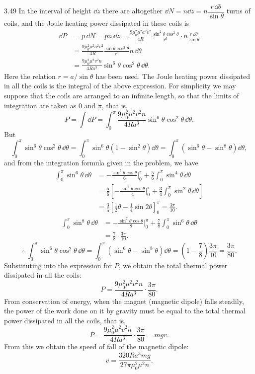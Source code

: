 \begin{solution}{3.49}
In the interval of height $\dd z$ there are altogether $\dd N=n\dd z=n\dfrac{r\,\dd\theta}{\sin\theta}$ turns of coils, and the Joule heating power dissipated in these coils is
\begin{align*}
\dd P &= p\,\dd N=pn\,\dd z=\frac{9\mu_0^2\mu^2a^2v^2}{4R}\frac{\sin^2\theta\cos^2\theta}{r^6}\cdot n\frac{r\,\dd\theta}{\sin\theta}\\
&= \frac{9\mu_0^2\mu^2a^2v^2}{4R}\frac{\sin\theta\cos^2\theta}{r^5}n\,\dd\theta\\
&= \frac{9\mu_0^2\mu^2v^2n}{4Ra^3}\sin^6\theta\cos^2\theta\,\dd\theta.
\end{align*}
Here the relation $r=a/\sin\theta$ has been used. The Joule heating power dissipated in all the coils is the integral of the above expression. For simplicity we may suppose that the coils are arranged to an infinite length, so that the limits of integration are taken as $0$ and $\pi$, that is,
\[
P=\int\dd P=\int_0^{\pi}\frac{9\mu_0^2\mu^2v^2n}{4Ra^3}\sin^6\theta\cos^2\theta\,\dd\theta.
\]
But
\[
\int_0^{\pi}\sin^6\theta\cos^2\theta\,\dd\theta
=\int_0^{\pi}\sin^6\theta\left(1-\sin^2\theta\right)\dd\theta
=\int_0^{\pi}\left(\sin^6\theta-\sin^8\theta\right)\dd\theta,
\]
and from the integration formula given in the problem, we have
\begin{align*}
\int_0^{\pi}\sin^6\theta\,\dd\theta
&= -\frac{\sin^5\theta\cos\theta}{6}\bigg|_0^{\pi}+\frac{5}{6}\int_0^{\pi}\sin^4\theta\,\dd\theta\\
&= \frac{5}{6}\left[-\frac{\sin^3\theta\cos\theta}{4}\bigg|_0^{\pi}+\frac{3}{4}\int_0^{\pi}\sin^2\theta\,\dd\theta\right]\\
&= \frac{3}{5}\left[\frac{1}{2}\theta-\frac{1}{4}\sin2\theta\right]_0^{\pi}=\frac{3\pi}{10}.
\end{align*}
\begin{align*}
\int_0^{\pi}\sin^8\theta\,\dd\theta
&= -\frac{\sin^7\theta\cos\theta}{8}\bigg|_0^{\pi}+\frac{7}{8}\int_0^{\pi}\sin^6\theta\,\dd\theta\\
&= \frac{7}{8}\cdot\frac{3\pi}{10}.
\end{align*}
\[
\therefore\ \int_0^{\pi}\sin^6\theta\cos^2\theta\,\dd\theta
=\int_0^{\pi}\left(\sin^6\theta-\sin^8\theta\right)\dd\theta
=\left(1-\frac{7}{8}\right)\frac{3\pi}{10}=\frac{3\pi}{80}.
\]
Substituting into the expression for $P$, we obtain the total thermal power dissipated in all the coils:
\[
P=\frac{9\mu_0^2\mu^2v^2n}{4Ra^3}\cdot\frac{3\pi}{80}.
\]
From conservation of energy, when the magnet (magnetic dipole) falls steadily, the power of the work done on it by gravity must be equal to the total thermal power dissipated in all the coils, that is,
\[
P=\frac{9\mu_0^2\mu^2v^2n}{4Ra^3}\cdot\frac{3\pi}{80}=mgv.
\]
From this we obtain the speed of fall of the magnetic dipole:
\[
v=\frac{320Ra^3mg}{27\pi\mu_0^2\mu^2n}.
\]
\end{solution}

